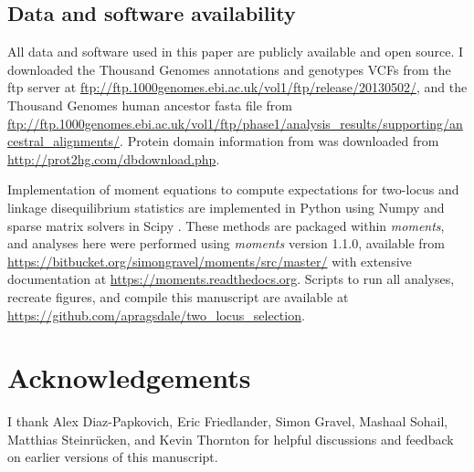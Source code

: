 \documentclass[]{article}
\begin{document}
\subsection{Data and software availability}
\label{data-and-software-availability}

All data and software used in this paper are publicly available and open source.
I downloaded the Thousand Genomes annotations and genotypes VCFs from the ftp
server at \url{ftp://ftp.1000genomes.ebi.ac.uk/vol1/ftp/release/20130502/}, and
the Thousand Genomes human ancestor fasta file from
\url{ftp://ftp.1000genomes.ebi.ac.uk/vol1/ftp/phase1/analysis_results/supporting/ancestral_alignments/}.
Protein domain information from \citet{Stanek2020-pa} was downloaded from
\url{http://prot2hg.com/dbdownload.php}.

Implementation of moment equations to compute expectations for two-locus and
linkage disequilibrium statistics are implemented in Python using Numpy
\citep{Harris2020-pc} and sparse matrix solvers in Scipy \citep{Virtanen2020-kr}. These
methods are packaged within \emph{moments}, and analyses here were performed using
\emph{moments} version 1.1.0, available from
\url{https://bitbucket.org/simongravel/moments/src/master/} with extensive
documentation at \url{https://moments.readthedocs.org}. Scripts to run all
analyses, recreate figures, and compile this manuscript are available at
\url{https://github.com/apragsdale/two_locus_selection}.

\section{Acknowledgements}\label{acknowledgements}

I thank Alex Diaz-Papkovich, Eric Friedlander, Simon Gravel, Mashaal Sohail,
Matthias Steinrücken, and Kevin Thornton for helpful discussions and feedback
on earlier versions of this manuscript.

  

\end{document}
